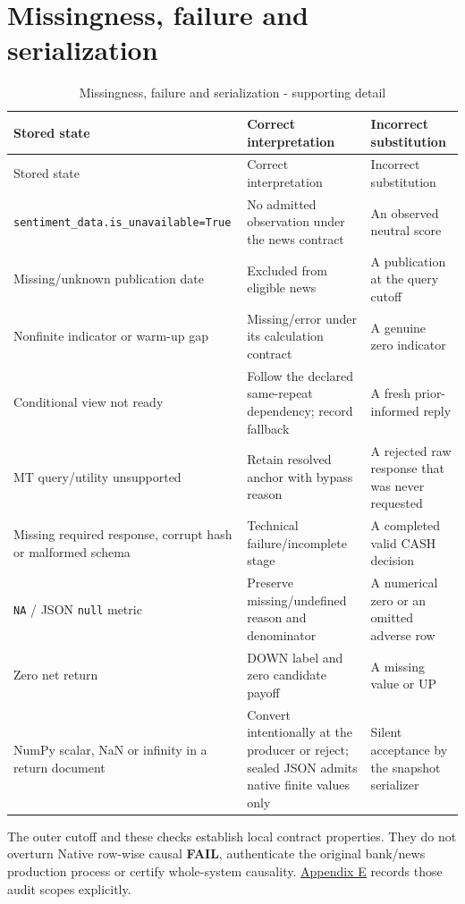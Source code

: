 \section{Missingness, failure and serialization}\label{s:3cd06f35e6a0aac8}

\begingroup
\small
{}
\setlength{\tabcolsep}{3pt}

\begin{longtable}[]{@{}
  >{\raggedright\arraybackslash}p{}
  >{\raggedright\arraybackslash}p{}
  >{\raggedright\arraybackslash}p{}@{}}
\caption{Missingness, failure and serialization - supporting detail}\label{tab:A_contracts:4}\tabularnewline
\toprule\noalign{}
Stored state
 & Correct interpretation
 & Incorrect substitution
 \\
\midrule\noalign{}
\endfirsthead
\toprule\noalign{}
Stored state
 & Correct interpretation
 & Incorrect substitution
 \\
\midrule\noalign{}
\endhead
\bottomrule\noalign{}
\endlastfoot
\texttt{sentiment\_\allowbreak{}data.\allowbreak{}is\_\allowbreak{}unavailable=True} & No admitted observation under the news contract & An observed neutral score \\
Missing/unknown publication date & Excluded from eligible news & A publication at the query cutoff \\
Nonfinite indicator or warm-up gap & Missing/error under its calculation contract & A genuine zero indicator \\
Conditional view not ready & Follow the declared same-repeat dependency; record fallback & A fresh prior-informed reply \\
MT query/utility unsupported & Retain resolved anchor with bypass reason & A rejected raw response that was never requested \\
Missing required response, corrupt hash or malformed schema & Technical failure/incomplete stage & A completed valid CASH decision \\
\texttt{NA} / JSON \texttt{null} metric & Preserve missing/undefined reason and denominator & A numerical zero or an omitted adverse row \\
Zero net return & DOWN label and zero candidate payoff & A missing value or UP \\
NumPy scalar, NaN or infinity in a return document & Convert intentionally at the producer or reject; sealed JSON admits native finite values only & Silent acceptance by the snapshot serializer \\
\end{longtable}

\endgroup

The outer cutoff and these checks establish local contract properties.
They do not overturn Native row-wise causal \textbf{FAIL}, authenticate the
original bank/news production process or certify whole-system causality.
\hyperref[s:8356fa5ade54dd36]{Appendix E} records those audit scopes explicitly.
